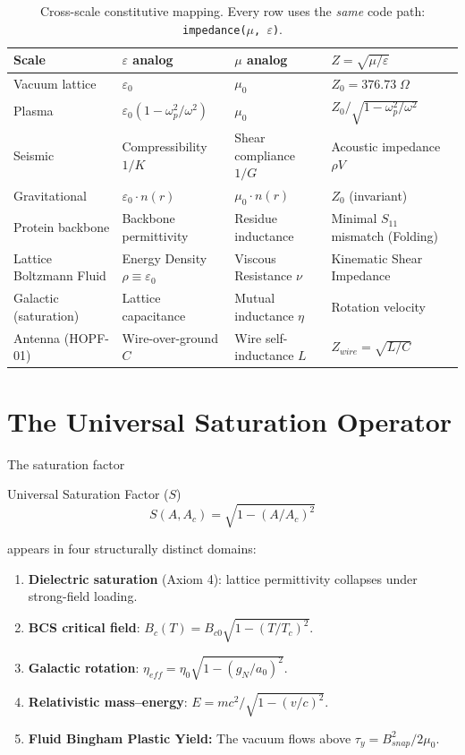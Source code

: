 \begin{table}[H]
\centering\small
\caption{Cross-scale constitutive mapping.  Every row uses the
\textit{same} code path: \texttt{impedance($\mu$, $\varepsilon$)}.}
\label{tab:cross_scale}
\begin{tabular}{llll}
\toprule
\textbf{Scale} & \textbf{$\varepsilon$ analog}
  & \textbf{$\mu$ analog}
  & \textbf{$Z = \sqrt{\mu/\varepsilon}$} \\
\midrule
Vacuum lattice
  & $\varepsilon_0$
  & $\mu_0$
  & $Z_0 = 376.73\;\Omega$ \\
Plasma
  & $\varepsilon_0(1 - \omega_p^2/\omega^2)$
  & $\mu_0$
  & $Z_0/\sqrt{1-\omega_p^2/\omega^2}$ \\
Seismic
  & Compressibility $1/K$
  & Shear compliance $1/G$
  & Acoustic impedance $\rho V$ \\
Gravitational
  & $\varepsilon_0 \cdot n(r)$
  & $\mu_0 \cdot n(r)$
  & $Z_0$ (invariant) \\
Protein backbone
  & Backbone permittivity
  & Residue inductance
  & Minimal $S_{11}$ mismatch (Folding) \\
Lattice Boltzmann Fluid
  & Energy Density $\rho \equiv \varepsilon_0$
  & Viscous Resistance $\nu$
  & Kinematic Shear Impedance \\
Galactic (saturation)
  & Lattice capacitance
  & Mutual inductance $\eta$
  & Rotation velocity \\
Antenna (HOPF-01)
  & Wire-over-ground $C$
  & Wire self-inductance $L$
  & $Z_{wire} = \sqrt{L/C}$ \\
\bottomrule
\end{tabular}
\end{table}


\section{The Universal Saturation Operator}
\label{sec:universal_saturation}

The saturation factor
\begin{resultbox}{Universal Saturation Factor ($S$)}
\begin{equation}
    S(A, A_c) = \sqrt{1 - (A/A_c)^2}
    \label{eq:saturation_sigma}
\end{equation}
\end{resultbox}
appears in four structurally distinct domains:

\begin{enumerate}
    \item \textbf{Dielectric saturation} (Axiom 4): lattice permittivity
          collapses under strong-field loading.
    \item \textbf{BCS critical field}: $B_c(T) = B_{c0}\sqrt{1-(T/T_c)^2}$.
    \item \textbf{Galactic rotation}: $\eta_{eff} = \eta_0\sqrt{1-(g_N/a_0)^2}$.
    \item \textbf{Relativistic mass--energy}: $E = mc^2/\sqrt{1-(v/c)^2}$.
    \item \textbf{Fluid Bingham Plastic Yield:} The vacuum flows above $\tau_y = B_{snap}^2/2\mu_0$.
\end{enumerate}

